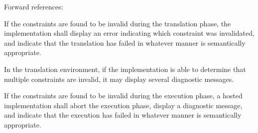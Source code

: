 
Forward references: 


\specsubitem
If the constraints are found to be invalid during the translation phase, the
implementation shall display an error indicating which constraint was
invalidated, and indicate that the translation has failed in whatever manner is
semantically appropriate.


\specsubitem
In the translation environment, if the implementation is able to determine that
multiple constraints are invalid, it may display several diagnostic messages.

\specsubitem
If the constraints are found to be invalid during the execution phase, a hosted
implementation shall abort the execution phase, display a diagnostic message,
and indicate that the execution has failed in whatever manner is semantically
appropriate.

